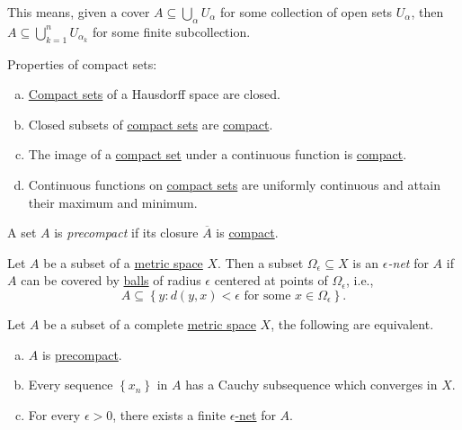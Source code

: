 This means, given a cover \(A \subseteq \bigcup_{\alpha} U_\alpha \) for some collection of open sets \(U_\alpha \), then \(A \subseteq \bigcup_{k=1}^{n} U_{\alpha _k}\) for some finite subcollection.

\begin{remark}
	Properties of compact sets:
	\begin{enumerate}[(a)]
		\item \hyperref[def:compact]{Compact sets} of a Hausdorff space are closed.
		\item Closed subsets of \hyperref[def:compact]{compact sets} are \hyperref[def:compact]{compact}.
		\item The image of a \hyperref[def:compact]{compact set} under a continuous function is \hyperref[def:compact]{compact}.
		\item Continuous functions on \hyperref[def:compact]{compact sets} are uniformly continuous and attain their maximum and minimum.
	\end{enumerate}
\end{remark}

\begin{definition}[Precompact]\label{def:precompact}
	A set \(A\) is \emph{precompact} if its closure \(\overline{A} \) is \hyperref[def:compact]{compact}.
\end{definition}

\begin{definition}\label{def:eps-net}
	Let \(A\) be a subset of a \hyperref[prev:metric]{metric space} \(X\). Then a subset \(\Omega _{\epsilon } \subseteq X\) is an \emph{\(\epsilon \)-net} for \(A\) if \(A\) can be covered by \hyperref[def:ball]{balls} of radius \(\epsilon \) centered at points of \(\Omega _{\epsilon }\), i.e.,
	\[
		A \subseteq \left\{ y\colon d(y, x) < \epsilon \text{ for some } x\in \Omega _\epsilon  \right\}.
	\]
\end{definition}

\begin{theorem}\label{thm:precompact}
	Let \(A\) be a subset of a complete \hyperref[prev:metric]{metric space} \(X\), the following are equivalent.
	\begin{enumerate}[(a)]
		\item \(A\) is \hyperref[def:precompact]{precompact}.
		\item Every sequence \(\left\{ x_n \right\} \)  in \(A\) has a Cauchy subsequence which converges in \(X\).
		\item For every \(\epsilon > 0\), there exists a finite \hyperref[def:eps-net]{\(\epsilon \)-net} for \(A\).
	\end{enumerate}
\end{theorem}

